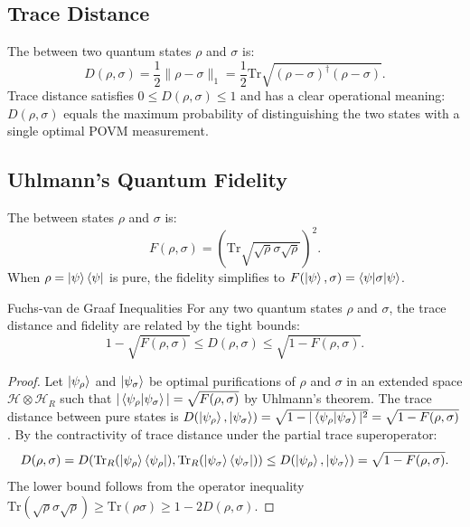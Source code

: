 \subsection{Trace Distance}
The  between two quantum states $\rho$ and $\sigma$ is:
\begin{equation}
    D(\rho, \sigma) = \frac{1}{2} \|\rho - \sigma\|_1 = \frac{1}{2} \text{Tr}\sqrt{(\rho - \sigma)^\dagger (\rho - \sigma)}.
    \label{eq:trace_distance_def_v2}
\end{equation}
Trace distance satisfies $0 \le D(\rho, \sigma) \le 1$ and has a clear operational meaning: $D(\rho, \sigma)$ equals the maximum probability of distinguishing the two states with a single optimal POVM measurement.

\subsection{Uhlmann's Quantum Fidelity}
The  between states $\rho$ and $\sigma$ is:
\begin{equation}
    F(\rho, \sigma) = \left( \text{Tr}\sqrt{\sqrt{\rho}\sigma\sqrt{\rho}} \right)^2.
    \label{eq:uhlmann_fidelity_def_v2}
\end{equation}
When $\rho = \ket{\psi}\bra{\psi}$ is pure, the fidelity simplifies to $F(\ket{\psi}, \sigma) = \braket{\psi|\sigma|\psi}$.

\begin{theorembox}{Fuchs-van de Graaf Inequalities}
For any two quantum states $\rho$ and $\sigma$, the trace distance and fidelity are related by the tight bounds:
\begin{equation}
    1 - \sqrt{F(\rho, \sigma)} \le D(\rho, \sigma) \le \sqrt{1 - F(\rho, \sigma)}.
    \label{eq:fuchs_van_de_graaf_v2}
\end{equation}
\end{theorembox}

\begin{proof}
Let $\ket{\psi_\rho}$ and $\ket{\psi_\sigma}$ be optimal purifications of $\rho$ and $\sigma$ in an extended space $\mathcal{H} \otimes \mathcal{H}_R$ such that $|\braket{\psi_\rho|\psi_\sigma}| = \sqrt{F(\rho, \sigma)}$ by Uhlmann's theorem.
The trace distance between pure states is $D(\ket{\psi_\rho}, \ket{\psi_\sigma}) = \sqrt{1 - |\braket{\psi_\rho|\psi_\sigma}|^2} = \sqrt{1 - F(\rho, \sigma)}$.
By the contractivity of trace distance under the partial trace superoperator:
\begin{equation}
    D(\rho, \sigma) = D(\text{Tr}_R(\ket{\psi_\rho}\bra{\psi_\rho}), \text{Tr}_R(\ket{\psi_\sigma}\bra{\psi_\sigma})) \le D(\ket{\psi_\rho}, \ket{\psi_\sigma}) = \sqrt{1 - F(\rho, \sigma)}.
\end{equation}
The lower bound follows from the operator inequality $\text{Tr}(\sqrt{\rho}\sigma\sqrt{\rho}) \ge \text{Tr}(\rho \sigma) \ge 1 - 2 D(\rho, \sigma)$.
\end{proof}

